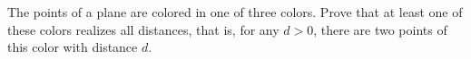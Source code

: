 The points of a plane are colored in one of three colors. Prove that at least one of these colors realizes all distances, that is, for any $d > 0$, there are two points of this color with distance $d$.
